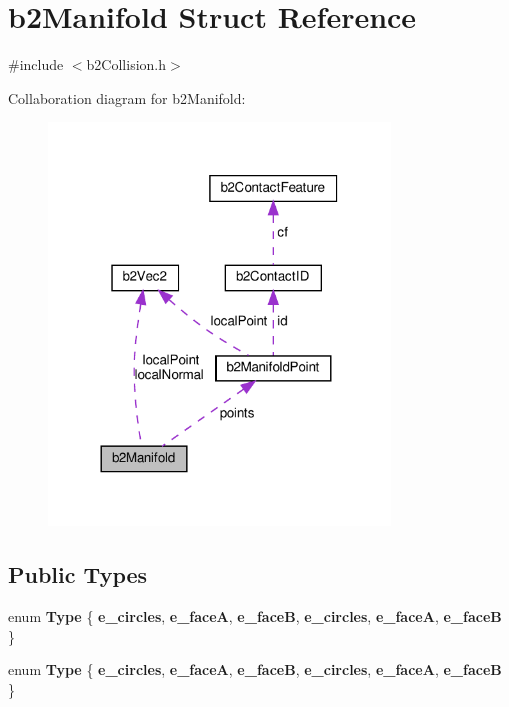 \hypertarget{structb2Manifold}{}\section{b2\+Manifold Struct Reference}
\label{structb2Manifold}


{\ttfamily \#include $<$b2\+Collision.\+h$>$}



Collaboration diagram for b2\+Manifold\+:
\nopagebreak
\begin{figure}[H]
\begin{center}
\leavevmode
\includegraphics[width=257pt]{structb2Manifold__coll__graph}
\end{center}
\end{figure}
\subsection*{Public Types}
\begin{DoxyCompactItemize}
\item 
\mbox{\label{structb2Manifold_aa9c347e2ff2e27ee820a926efbb33e12}} 
enum {\bfseries Type} \{ \newline
{\bfseries e\+\_\+circles}, 
{\bfseries e\+\_\+faceA}, 
{\bfseries e\+\_\+faceB}, 
{\bfseries e\+\_\+circles}, 
\newline
{\bfseries e\+\_\+faceA}, 
{\bfseries e\+\_\+faceB}
 \}
\item 
\mbox{\label{structb2Manifold_aa9c347e2ff2e27ee820a926efbb33e12}} 
enum {\bfseries Type} \{ \newline
{\bfseries e\+\_\+circles}, 
{\bfseries e\+\_\+faceA}, 
{\bfseries e\+\_\+faceB}, 
{\bfseries e\+\_\+circles}, 
\newline
{\bfseries e\+\_\+faceA}, 
{\bfseries e\+\_\+faceB}
 \}
\end{DoxyCompactItemize}
